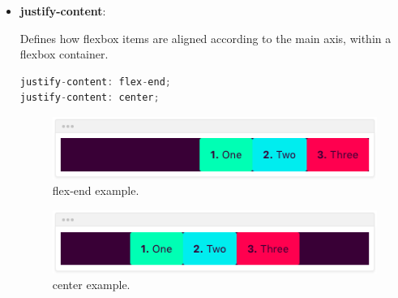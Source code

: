 \documentclass[a4paper, 12pt, english]{book}
\begin{document}
\begin{itemize}
    \item \textbf{justify-content}:

        Defines how flexbox items are aligned according to the main axis, within a flexbox container.
        \begin{lstlisting}[language=javascript]
justify-content: flex-end;
justify-content: center;
        \end{lstlisting}
        \begin{figure}
          \centering
          \includegraphics[width=11cm, keepaspectratio]{img/flex-end-example}
          \caption{flex-end example.}
          \label{fig:flex-end-example}
        \end{figure}
        \begin{figure}
          \centering
          \includegraphics[width=11cm, keepaspectratio]{img/center-example}
          \caption{center example.}
          \label{fig:center-example}
        \end{figure}
\end{itemize}





\end{document}
